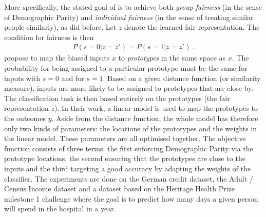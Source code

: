 More specifically, the stated goal of \citet{zemel2013learning} is
to achieve both \emph{group fairness} (in the sense of Demographic Parity)
and \emph{individual fairness} (in the sense of treating similar people similarly),
as \citet{dwork2012fairness} did before.
Let \(z\) denote the learned fair representation.
The condition for fairness is then
\begin{align}
  \label{eq:fair-representation}
  P(s=0|z=z') = P(s=1|z=z') ~.
\end{align}
\citet{zemel2013learning} propose to map the biased inputs \(x\) to \emph{prototypes} in the same space as \(x\).
The probability for being assigned to a particular prototype
must be the same for inputs with \(s=0\) and for \(s=1\).
Based on a given distance function (or similarity measure),
inputs are more likely to be assigned to prototypes that are close-by.
The classification task is then based entirely on the prototypes (the fair representation \(z\)).
In their work, a linear model is used to map the prototypes to the outcomes \(y\).
Aside from the distance function, the whole model has therefore only two kinds of parameters:
the locations of the prototypes and the weights in the linear model.
These parameters are all optimised together.
The objective function consists of three terms:
the first enforcing Demographic Parity via the prototype locations,
the second ensuring that the prototypes are close to the inputs
and the third targeting a good accuracy by adapting the weights of the classifier.
%
The experiments are done on the German credit dataset, the Adult / Census Income dataset
and a dataset based on the Heritage Health Prize milestone 1 challenge
where the goal is to predict how many days a given person will spend in the hospital in a year.


